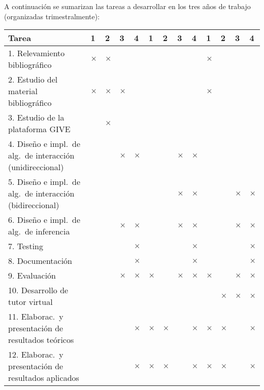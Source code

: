 \medskip

\noindent
A continuaci\'on se sumarizan las tareas a desarrollar en los tres a\~nos de
trabajo (organizadas trimestralmente):

{\footnotesize
\begin{center}
\begin{tabular}{|p{7cm}||p{2mm}|p{2mm}|p{2mm}|p{2mm}||p{2mm}|p{2mm}|p{2mm}|p{2mm
}||p{2mm}|p{2mm}|p{2mm}|p{2mm}||}
\hline
 \rowcolor[rgb]{0.8,0.8,0.8}\hspace{3.5cm}Tarea & 1 & 2 & 3 & 4 & 1 & 2 & 3 & 4
& 1 & 2 & 3 & 4\\
\hline 1. Relevamiento bibliogr\'afico
& $\times$ & $\times$ &&&&&&&$\times$&&&\\
\hline 2. Estudio del material bibliogr\'afico
& $\times$ & $\times$ & $\times$ &  &&&&&$\times$&&&\\
\hline 3. Estudio de la plataforma GIVE
& & $\times$ & &&&&&&&&&\\
\hline 4. Dise\~no e impl.\ de alg.\ de interacci\'on (unidireccional)
& & & $\times$ & $\times$&&&$\times$&$\times$&&&&\\
\hline 5. Dise\~no e impl.\ de alg.\ de interacci\'on (bidireccional)
& & &  & &&&$\times$&$\times$&&&$\times$&$\times$\\
\hline 6. Dise\~no e impl.\ de alg.\ de inferencia
& & & $\times$ & $\times$&&&$\times$&$\times$&&&$\times$&$\times$\\
\hline 7. Testing
&&&&$\times$&&&&$\times$&&&&$\times$\\
\hline 8. Documentaci\'on
&&&&$\times$&&&&$\times$&&&&$\times$\\
\hline 9. Evaluaci\'on
&&&$\times$&$\times$&$\times$&&$\times$&$\times$&$\times$&&$\times$&$\times$\\
\hline 10. Desarrollo de tutor virtual
&&&&&&&&&&$\times$&$\times$&$\times$\\
\hline 11. Elaborac.\ y presentaci\'on de resultados te\'oricos
&&&&$\times$&$\times$&$\times$&&$\times$&$\times$&$\times$&&$\times$\\
\hline 12. Elaborac.\ y presentaci\'on de resultados aplicados
&&&&$\times$&$\times$&$\times$&&$\times$&$\times$&$\times$&&$\times$\\\hline
\end{tabular}\end{center}
}


